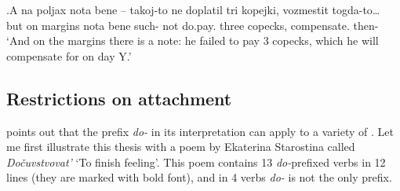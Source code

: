 \exg.\label{ex:do:measure}A na poljax nota bene -- takoj-to ne doplatil tri kopejki, vozmestit togda-to…\\
but on margins nota bene {} such- not do.pay. three copecks, compensate. then-\\
\trans `And on the margins there is a note: he failed to pay 3 copecks, which he will compensate for on day Y.'

\subsection{Restrictions on attachment}
\citet[236]{Kagan:12} points out that the prefix \textit{do-} in its  interpretation can apply to a variety of . Let me first illustrate this thesis with a poem by Ekaterina Starostina called \textit{Do\v{c}uvstvovat'} `To finish feeling'. This poem contains 13 \textit{do-}prefixed verbs in 12 lines (they are marked with bold font), and in 4 verbs \textit{do-} is not the only prefix.

